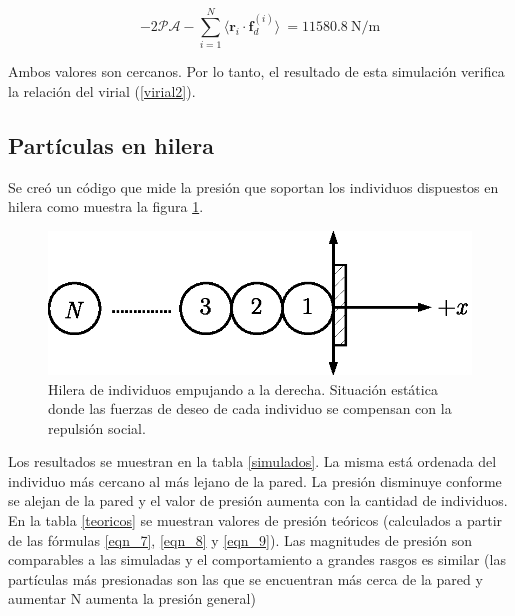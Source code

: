 \begin{equation}
 -2\mathcal{PA} -\displaystyle\sum_{i=1}^N \langle
\mathbf{r}_i\cdot\mathbf{f}_d^{(i)}\rangle\ =  11580.8\ \text{N/m}
\end{equation}

Ambos valores son cercanos. Por lo tanto, el resultado de esta simulación verifica la relación del virial (\ref{virial2}).


\subsection{Partículas en hilera}

Se creó un código que mide la presión que soportan los individuos dispuestos en hilera como muestra la figura \ref{hilera}.  

\begin{figure}[!htbp]
\center
\includegraphics[scale=1]{figuras/hilera.eps}
\caption[width=5cm]{Hilera de individuos empujando a la derecha. Situación estática donde las fuerzas de deseo de cada individuo se compensan con la repulsión social.}
\label{hilera}
\end{figure}

Los resultados se muestran en la tabla \ref{simulados}. La misma está ordenada del individuo más cercano al más lejano de la pared. La presión disminuye conforme se alejan de la pared y el valor de presión aumenta con la cantidad de individuos.\\
En la tabla \ref{teoricos} se muestran valores de presión teóricos (calculados a partir de las fórmulas \ref{eqn_7}, \ref{eqn_8} y \ref{eqn_9}). Las magnitudes de presión son comparables a las simuladas y el comportamiento a grandes rasgos es similar (las partículas más presionadas son las que se encuentran más cerca de la pared y aumentar N aumenta la presión general)  

